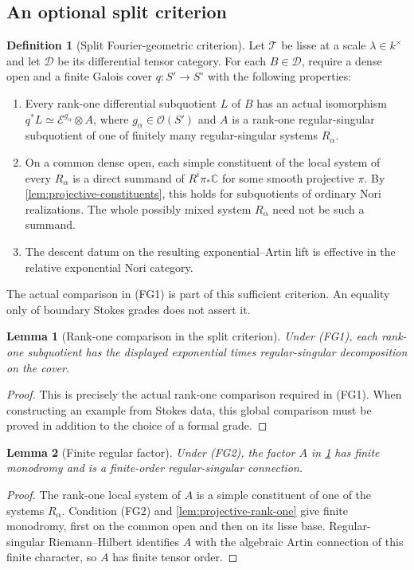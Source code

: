 \documentclass[11pt]{article}
\numberwithin{equation}{section}
\newtheorem{lemma}[lemma]{Lemma}
\theoremstyle{definition}
\newtheorem{definition}[definition]{Definition}
\theoremstyle{remark}
\newcommand{\C}{\mathbb C}
\newcommand{\Ocal}{\mathcal O}
\newcommand{\Ecal}{\mathcal E}
\newcommand{\Tcal}{\mathcal T}
\newcommand{\Dcal}{\mathcal D}
\begin{document}
\subsection{An optional split criterion}

\begin{definition}[Split Fourier-geometric criterion]\label{def:split-FG}
Let $\Tcal$ be lisse at a scale $\lambda\in k^\times$ and let $\Dcal$
be its differential tensor category. For each $B\in\Dcal$, require a
dense open and a finite Galois cover $q:S'\to S^\circ$ with the following
properties:
\begin{enumerate}[label=\textup{(FG\arabic*)},leftmargin=3.2em]
\item Every rank-one differential subquotient $L$ of $B$ has an actual
isomorphism $q^*L\simeq\Ecal^{g_\alpha}\otimes A$, where
$g_\alpha\in\Ocal(S')$ and $A$ is a rank-one regular-singular subquotient
of one of finitely many regular-singular systems $R_\alpha$.
\item On a common dense open, each simple constituent of the local
system of every $R_\alpha$ is a direct summand of $R^i\pi_*\C$ for
some smooth projective $\pi$. By \cref{lem:projective-constituents},
this holds for subquotients of ordinary Nori realizations. The whole
possibly mixed system $R_\alpha$ need not be such a summand.
\item The descent datum on the resulting exponential--Artin lift is
effective in the relative exponential Nori category.
\end{enumerate}
The actual comparison in \textup{(FG1)} is part of this sufficient
criterion. An equality only of boundary Stokes grades does not assert it.
\end{definition}

\begin{lemma}[Rank-one comparison in the split criterion]\label{lem:one-grade}
Under \textup{(FG1)}, each rank-one subquotient has the displayed
exponential times regular-singular decomposition on the cover.
\end{lemma}
\begin{proof}
This is precisely the actual rank-one comparison required in
\textup{(FG1)}. When constructing an example from Stokes data, this global
comparison must be proved in addition to the choice of a formal grade.
\end{proof}

\begin{lemma}[Finite regular factor]\label{lem:regular-finite}
Under \textup{(FG2)}, the factor $A$ in \cref{lem:one-grade} has finite
monodromy and is a finite-order regular-singular connection.
\end{lemma}
\begin{proof}
The rank-one local system of $A$ is a simple constituent of one of the
systems $R_\alpha$. Condition \textup{(FG2)} and
\cref{lem:projective-rank-one} give finite monodromy, first on the common
open and then on its lisse base. Regular-singular Riemann--Hilbert
identifies $A$ with the algebraic Artin connection of this finite
character, so $A$ has finite tensor order.
\end{proof}
\end{document}
